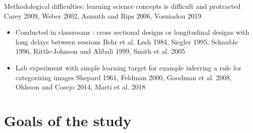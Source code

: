 \documentclass[11pt]{beamer}
\begin{document}
                \begin{frame}
                  
                  Methodological difficulties: learning science concepts is difficult and protracted \footnotesize{Carey 2009, Weber 2002, Asmuth and Rips 2006, Vosniadou 2019}

                  \normalsize

                  \begin{itemize}

                    
                 \item{ Conducted in classrooms : cross sectional designs or longitudinal designs with long delays between sessions
                   \footnotesize{Behr et al. Lesh 1984,  Siegler 1995,  Schauble 1996, Rittle-Johnson and Alibali 1999, Smith et al. 2005}}
                   
                  \normalsize

                 \item{ Lab experiment with simple learning target for example inferring a rule for categorizing images \footnotesize{Shepard 1961, Feldman 2000, Goodman et al. 2008, Ohlsson and Cosejo 2014, Marti et al. 2018}}

                  \end{itemize}
                  
                \end{frame}


                \section{Goals of the study}
\end{document}
